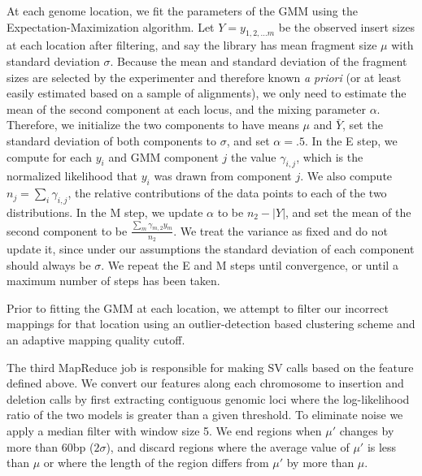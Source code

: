 \begin{description}
At each genome location, we fit the parameters of the GMM using the Expectation-Maximization algorithm. Let $Y = y_{1,2, \ldots m}$ be the observed insert sizes at each location after filtering, and say the library has mean fragment size $\mu$ with standard deviation $\sigma$. Because the mean and standard deviation of the fragment sizes are selected by the experimenter and therefore known \emph{a priori} (or at least easily estimated based on a sample of alignments), we only need to estimate the mean of the second component at each locus, and the mixing parameter $\alpha$. Therefore, we initialize the two components to have means $\mu$ and $\bar{Y}$, set the standard deviation of both components to $\sigma$, and set $\alpha = .5$. In the E step, we compute for each $y_i$ and GMM component $j$ the value $\gamma_{i,j}$, which is the normalized likelihood that $y_i$ was drawn from component $j$. We also compute $n_j = \sum_i{\gamma_{i,j}}$, the relative contributions of the data points to each of the two distributions. In the M step, we update $\alpha$ to be $n_2 - \left|Y\right|$, and set the mean of the second component to be $\frac{\sum_m{\gamma_{m,2}y_m}}{n_2}$. We treat the variance as fixed and do not update it, since under our assumptions the standard deviation of each component should always be $\sigma$. We repeat the E and M steps until convergence, or until a maximum number of steps has been taken.

Prior to fitting the GMM at each location, we attempt to filter our incorrect mappings for that location using an outlier-detection based clustering scheme and an adaptive mapping quality cutoff.

\item[\sc{PostProcess}] The third MapReduce job is responsible for making SV calls based on the feature defined above. We convert our features along each chromosome to insertion and deletion calls by first extracting contiguous genomic loci where the log-likelihood ratio of the two models is greater than a given threshold. To eliminate noise we apply a median filter with window size 5. We end regions when $\mu'$ changes by more than 60bp ($2\sigma$), and discard regions where the average value of $\mu'$ is less than $\mu$ or where the length of the region differs from $\mu'$ by more than $\mu$.
\end{description}


